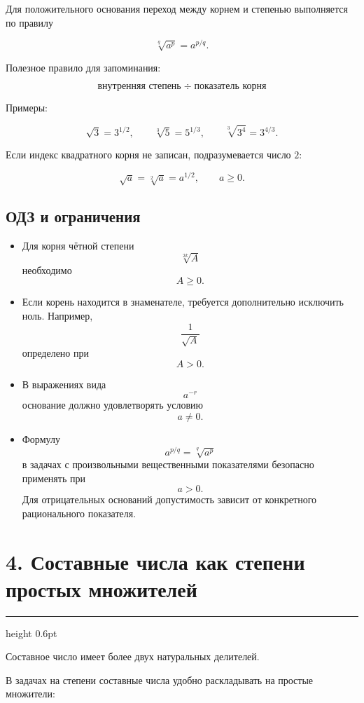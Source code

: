\documentclass[a4paper,12pt]{article}
\newcommand{\sectionline}{
  \par
  \vspace{0.2em}
  {\color{accent}\hrule height 0.6pt}
  \vspace{0.8em}
}
\begin{document}
Для положительного основания переход между корнем и степенью выполняется
по правилу

\[
\sqrt[q]{a^p}=a^{p/q}.
\]

Полезное правило для запоминания:

\[
\boxed{
\text{внутренняя степень}
\; \div \;
\text{показатель корня}
}
\]

Примеры:

\[
\sqrt3=3^{1/2},
\qquad
\sqrt[3]{5}=5^{1/3},
\qquad
\sqrt[3]{3^4}=3^{4/3}.
\]

Если индекс квадратного корня не записан, подразумевается число $2$:

\[
\sqrt a=\sqrt[2]{a}=a^{1/2},
\qquad a\ge0.
\]

\subsection*{ОДЗ и ограничения}

\begin{itemize}
  \item Для корня чётной степени
  \[
  \sqrt[2k]{A}
  \]
  необходимо
  \[
  A\ge0.
  \]

  \item Если корень находится в знаменателе, требуется дополнительно
  исключить ноль. Например,
  \[
  \frac1{\sqrt A}
  \]
  определено при
  \[
  A>0.
  \]

  \item В выражениях вида
  \[
  a^{-r}
  \]
  основание должно удовлетворять условию
  \[
  a\ne0.
  \]

  \item Формулу
  \[
  a^{p/q}=\sqrt[q]{a^p}
  \]
  в задачах с произвольными вещественными показателями безопасно
  применять при
  \[
  a>0.
  \]
  Для отрицательных оснований допустимость зависит от конкретного
  рационального показателя.
\end{itemize}


\section*{4. Составные числа как степени простых множителей}
\sectionline

Составное число имеет более двух натуральных делителей.

В задачах на степени составные числа удобно раскладывать на простые
множители:
\end{document}
